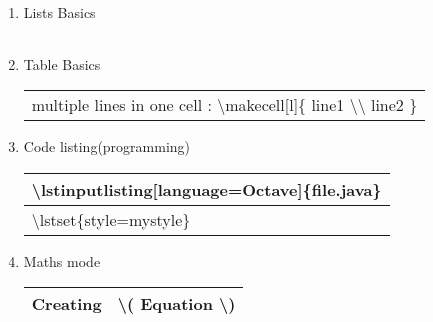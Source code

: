 \begin{enumerate}

     \item Lists Basics

          \begin{myTableStyle} \begin{tabular}{ |m{10cm}| } \hline
                \\ \hline
          \end{tabular} \end{myTableStyle} \vspace{0.08in}

     \item Table Basics

          \begin{myTableStyle} \begin{tabular}{ |m{14cm}| } \hline
                \\ \hline
               multiple lines in one cell : \textbackslash makecell[l]\{ line1 \textbackslash \textbackslash \; line2 \}  \\ \hline
          \end{tabular} \end{myTableStyle} \vspace{0.08in}

     \item Code listing(programming)

          \begin{myTableStyle} \begin{tabular}{ |m{16cm}| } \hline
                    \textbackslash lstinputlisting[language=Octave]\{file.java\} \\ \hline
                    \textbackslash lstset\{style=mystyle\} \\ \hline
          \end{tabular} \end{myTableStyle} \vspace{0.08in}

     \item Maths mode

          \begin{myTableStyle} \begin{tabular}{ |m{8cm}|m{8cm}| } \hline
               Creating & \textbackslash ( Equation \textbackslash ) \\ \hline
          \end{tabular} \end{myTableStyle} \vspace{0.08in}
          \vspace{0.08in}


\end{enumerate}
